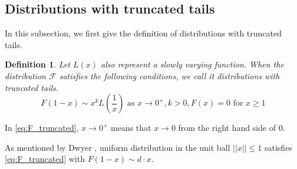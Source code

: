 \documentclass[conference,a4paper]{IEEEtran}
\newtheorem{definition}{Definition}
\begin{document}
\subsection{Distributions with truncated tails}
In this subsection, we first give the definition of distributions with truncated tails.
\begin{definition}
     Let $L(x)$ also represent a slowly varying function. When the distribution 
     $\mathcal{F}$ satisfies
     the following conditions, we call it distributions with truncated tails.
     \begin{equation}\label{eq:F_truncated}
          F(1-x) \sim x^k L\left(\frac{1}{x} \right)  \text{ as } x \to 0^+, k> 0,
          F(x) = 0 \text{ for } x \geq 1
     \end{equation}
\end{definition}

In \eqref{eq:F_truncated}, $x \to 0^+$ means that $x\to 0$ from the right hand side of $0$.

As mentioned by Dwyer \cite{dwyer1991convex}, uniform distribution
in the unit ball $||x||\leq 1$ satisfies \eqref{eq:F_truncated} with
$F(1-x) \sim d\cdot x$.
\end{document}
